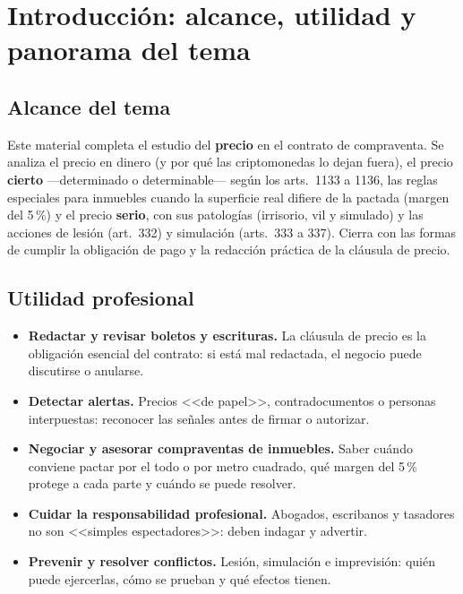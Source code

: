 \documentclass[12pt,oneside]{book}
\begin{document}
\chapter[Introducci\'on y panorama]{Introducci\'on: alcance, utilidad y panorama del tema}

\section{Alcance del tema}

Este material completa el estudio del \textbf{precio} en el contrato de compraventa. Se analiza el precio en dinero (y por qu\'e las criptomonedas lo dejan fuera), el precio \textbf{cierto} ---determinado o determinable--- seg\'un los arts.~1133 a 1136, las reglas especiales para inmuebles cuando la superficie real difiere de la pactada (margen del 5\,\%) y el precio \textbf{serio}, con sus patolog\'ias (irrisorio, vil y simulado) y las acciones de lesi\'on (art.~332) y simulaci\'on (arts.~333 a 337). Cierra con las formas de cumplir la obligaci\'on de pago y la redacci\'on pr\'actica de la cl\'ausula de precio.

\section{Utilidad profesional}

\begin{itemize}
    \item \textbf{Redactar y revisar boletos y escrituras.} La cl\'ausula de precio es la obligaci\'on esencial del contrato: si est\'a mal redactada, el negocio puede discutirse o anularse.
    \item \textbf{Detectar alertas.} Precios <<de papel>>, contradocumentos o personas interpuestas: reconocer las se\~nales antes de firmar o autorizar.
    \item \textbf{Negociar y asesorar compraventas de inmuebles.} Saber cu\'ando conviene pactar por el todo o por metro cuadrado, qu\'e margen del 5\,\% protege a cada parte y cu\'ando se puede resolver.
    \item \textbf{Cuidar la responsabilidad profesional.} Abogados, escribanos y tasadores no son <<simples espectadores>>: deben indagar y advertir.
    \item \textbf{Prevenir y resolver conflictos.} Lesi\'on, simulaci\'on e imprevisi\'on: qui\'en puede ejercerlas, c\'omo se prueban y qu\'e efectos tienen.
\end{itemize}
\end{document}
